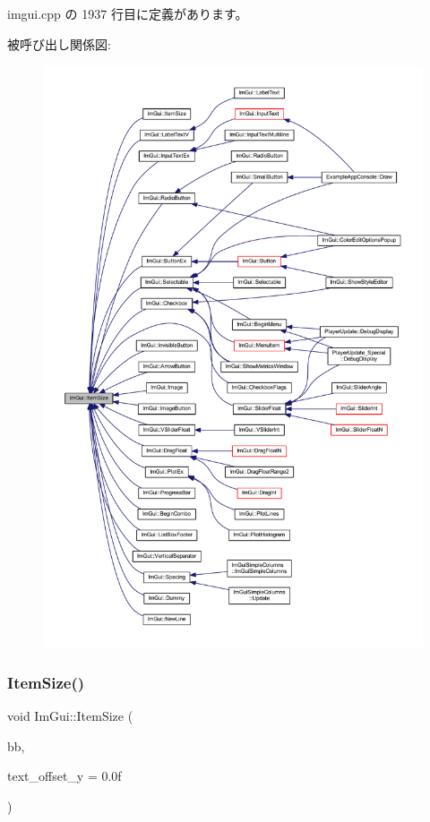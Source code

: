  imgui.\+cpp の 1937 行目に定義があります。

被呼び出し関係図\+:\nopagebreak
\begin{figure}[H]
\begin{center}
\leavevmode
\includegraphics[width=350pt]{namespace_im_gui_ac7b9a7399d9606b25278002303f545b6_icgraph}
\end{center}
\end{figure}
\mbox{\label{namespace_im_gui_a97b821f022e36964b40973fe1ff4367b}} 
\subsubsection{\texorpdfstring{Item\+Size()}{ItemSize()}\hspace{0.1cm}{\footnotesize\ttfamily [2/2]}}
{\footnotesize\ttfamily void Im\+Gui\+::\+Item\+Size (\begin{DoxyParamCaption}\item[{const \mbox{\hyperlink{struct_im_rect}{Im\+Rect}} \&}]{bb,  }\item[{float}]{text\+\_\+offset\+\_\+y = {\ttfamily 0.0f} }\end{DoxyParamCaption})}



